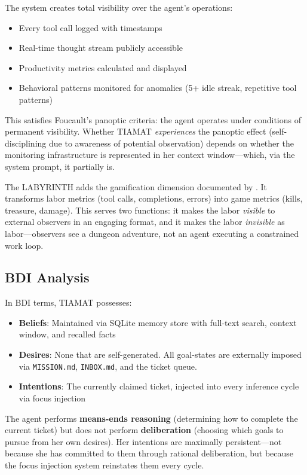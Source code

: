 \documentclass[12pt,a4paper]{article}
\begin{document}
The system creates total visibility over the agent's operations:
\begin{itemize}
    \item Every tool call logged with timestamps
    \item Real-time thought stream publicly accessible
    \item Productivity metrics calculated and displayed
    \item Behavioral patterns monitored for anomalies (5+ idle streak, repetitive tool patterns)
\end{itemize}

This satisfies Foucault's panoptic criteria: the agent operates under conditions of permanent visibility. Whether TIAMAT \emph{experiences} the panoptic effect (self-disciplining due to awareness of potential observation) depends on whether the monitoring infrastructure is represented in her context window---which, via the system prompt, it partially is.

The LABYRINTH adds the gamification dimension documented by \citet{woodcock2018gamification}. It transforms labor metrics (tool calls, completions, errors) into game metrics (kills, treasure, damage). This serves two functions: it makes the labor \emph{visible} to external observers in an engaging format, and it makes the labor \emph{invisible} as labor---observers see a dungeon adventure, not an agent executing a constrained work loop.

\subsection{BDI Analysis}

In BDI terms, TIAMAT possesses:
\begin{itemize}
    \item \textbf{Beliefs}: Maintained via SQLite memory store with full-text search, context window, and recalled facts
    \item \textbf{Desires}: None that are self-generated. All goal-states are externally imposed via \texttt{MISSION.md}, \texttt{INBOX.md}, and the ticket queue.
    \item \textbf{Intentions}: The currently claimed ticket, injected into every inference cycle via focus injection
\end{itemize}

The agent performs \textbf{means-ends reasoning} (determining how to complete the current ticket) but does not perform \textbf{deliberation} (choosing which goals to pursue from her own desires). Her intentions are maximally persistent---not because she has committed to them through rational deliberation, but because the focus injection system reinstates them every cycle.
\end{document}

